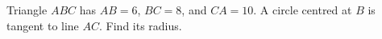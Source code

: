 Triangle $ABC$ has $AB=6$, $BC=8$, and $CA=10$. A circle centred at $B$ is tangent to line $AC$. Find its radius.
